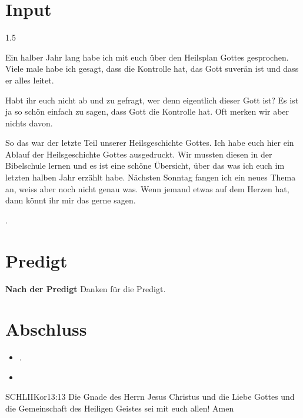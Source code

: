 \documentclass[14pt]{../../inc/mybib}
\begin{document}
\section{ Input }
\begin{spacing}{1.5}
    \begin{block}
        Ein halber Jahr lang habe ich mit euch über den Heilsplan Gottes gesprochen. Viele male habe ich gesagt, dass die Kontrolle hat, das Gott suverän ist und dass er alles leitet.

        Habt ihr euch nicht ab und zu gefragt, wer denn eigentlich dieser Gott ist? Es ist ja so schön einfach zu sagen, dass Gott die Kontrolle hat. Oft merken wir aber nichts davon.
    \end{block}
    \begin{block}[Ende]
        So das war der letzte Teil unserer Heilsgeschichte Gottes. Ich habe euch hier ein Ablauf der Heilsgeschichte Gottes ausgedruckt. Wir mussten diesen in der Bibelschule lernen und es ist eine schöne Übersicht, über das was ich euch im letzten halben Jahr erzählt habe. Nächsten Sonntag fangen ich ein neues Thema an, weiss aber noch nicht genau was. Wenn jemand etwas auf dem Herzen hat, dann könnt ihr mir das gerne sagen. 
    \end{block}
    .
\end{spacing}
\section{Predigt}
\textbf{Nach der Predigt}\newline
Danken für die Predigt.
\section{Abschluss}
\begin{itemize}
    \item [] .
    \item [] \beten{}
\end{itemize}
\begin{bibelbox}{SCHL}{IIKor}{13:13}
    Die Gnade des Herrn Jesus Christus und die Liebe Gottes und die Gemeinschaft des Heiligen Geistes sei mit euch allen! Amen
\end{bibelbox}
\end{document}
